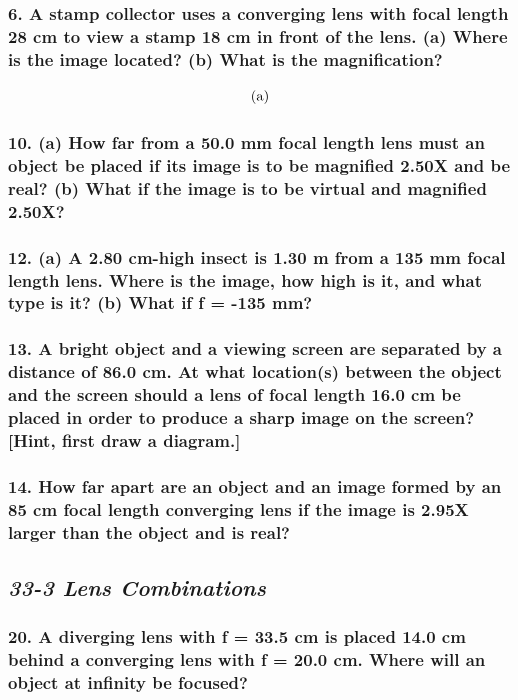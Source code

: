 \documentclass{article}
\begin{document}
\subsubsection*{
    6. A stamp collector uses a converging lens with focal length 28 cm to view a stamp
    18 cm in front of the lens. (a) Where is the image located? (b) What is the magnification?
}
\begin{align*}
    \intertext{(a)}
\end{align*}
\subsubsection*{
    10. (a) How far from a 50.0 mm focal length lens must an object be placed if its image
    is to be magnified 2.50X and be real? (b) What if the image is to be virtual and magnified 2.50X?
}
\subsubsection*{
    12. (a) A 2.80 cm-high insect is 1.30 m from a 135 mm focal length lens. Where is the image,
    how high is it, and what type is it? (b) What if f = -135 mm?
}
\subsubsection*{
    13. A bright object and a viewing screen are separated by a distance of 86.0 cm. At what location(s)
    between the object and the screen should a lens of focal length 16.0 cm be placed in order to produce
    a sharp image on the screen? [Hint, first draw a diagram.]
}
\subsubsection*{
    14. How far apart are an object and an image formed by an 85 cm focal length converging lens if the
    image is 2.95X larger than the object and is real?
}
\newpage
\begin{center}
    \subsection*{\textbf{\textit{33-3 Lens Combinations}}}
\end{center}
\subsubsection*{
    20. A diverging lens with f = 33.5 cm is placed 14.0 cm behind a converging lens with f = 20.0 cm.
    Where will an object at infinity be focused?
}
\end{document}
